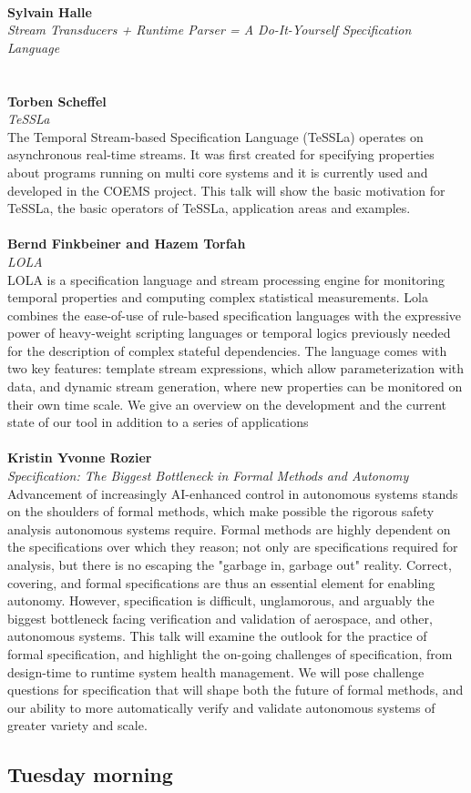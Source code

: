 \documentclass{article}
\newcounter{talkc}
\newcommand{\talk}[3]{\stepcounter{talkc}
\vspace{0.5em}~\\
\noindent
\textbf{#1}\\ 
\noindent\emph{#2}\\ 
\noindent#3\\
}
\begin{document}
%
\talk{Sylvain Halle}{Stream Transducers + Runtime Parser = A Do-It-Yourself Specification Language}{}
%
\talk{Torben Scheffel}{TeSSLa}{The Temporal Stream-based Specification Language (TeSSLa) operates on asynchronous real-time streams. It was first created for specifying properties about programs running on multi core systems and it is currently used and developed in the COEMS project. This talk will show the basic motivation for TeSSLa, the basic operators of TeSSLa, application areas and examples.}
%
\talk{Bernd Finkbeiner and Hazem Torfah}{LOLA}{LOLA is a specification language and stream processing engine for monitoring temporal properties and computing complex statistical measurements. Lola combines the ease-of-use of rule-based specification languages with the expressive power of heavy-weight scripting languages or temporal logics previously needed for the description of complex stateful dependencies. The language comes with two key features: template stream expressions, which allow parameterization with data, and dynamic stream generation, where new properties can be monitored on their own time scale. We give an overview on the development and the current state of our tool in addition to a series of applications}

\talk{Kristin Yvonne Rozier}{Specification: The Biggest Bottleneck in Formal Methods and Autonomy}{Advancement of increasingly AI-enhanced control in autonomous systems stands on the shoulders of formal methods, which make possible the rigorous safety analysis autonomous systems require. Formal methods are highly dependent on the specifications over which they reason; not only are specifications required for analysis, but there is no escaping the "garbage in, garbage out" reality. Correct, covering, and formal specifications are thus an essential element for enabling autonomy. However, specification is difficult, unglamorous, and arguably the biggest bottleneck facing verification and validation of aerospace, and other, autonomous systems. This talk will examine the outlook for the practice of formal specification, and highlight the on-going challenges of specification, from design-time to runtime system health management. We will pose challenge questions for specification that will shape both the future of formal methods, and our ability to more automatically verify and validate autonomous systems of greater variety and scale.}

\subsection*{Tuesday morning}
\end{document}
